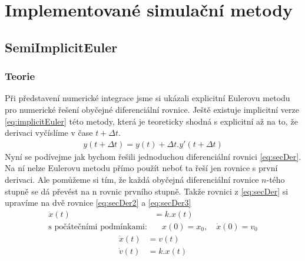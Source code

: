 \chapter{Implementované simulační metody}
\section{SemiImplicitEuler}
\label{sec:implEuler}
\subsection{Teorie}
Při představení numerické integrace jsme si ukázali explicitní Eulerovu metodu pro numerické řešení obyčejné diferenciální rovnice. Ještě existuje implicitní verze \eqref{eq:implicitEuler} této metody, která je teoreticky shodná s explicitní až na to, že derivaci vyčíslíme v čase $t + \Delta t $.
\begin{align} \label{eq:implicitEuler}
y(t+\Delta t) = y(t) + \Delta t . y'(t+\Delta t)
\end{align}
Nyní se podívejme jak bychom řešili jednoduchou diferenciální rovnici \eqref{eq:secDer}. Na ní nelze Eulerovu metodu přímo použít neboť ta řeší jen rovnice s první derivaci. Ale pomůžeme si tím, že každá obyčejná diferenciální rovnice $ n $-tého stupně se dá převést na n rovnic prvního stupně. Takže rovnici z \eqref{eq:secDer} si upravíme na dvě rovnice \eqref{eq:secDer2} a \eqref{eq:secDer3}
\begin{align} \label{eq:secDer}
\ddot{x}(t) &= k.x(t) \quad \\
\text{s počátečními podmínkami:}& \quad x(0)=x_0, \quad \dot{x}(0)=v_0\nonumber
\end{align}
\begin{subequations}
	\label{eq:secDer23}
	\begin{align}
	\label{eq:secDer2}
	\dot x(t)&= v(t) \\
	\label{eq:secDer3}
	\dot v(t)&=k.x(t)
	\end{align}
\end{subequations}

